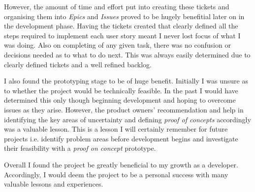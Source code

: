   However, the amount of time and effort put into creating these tickets and organising them into \textit{Epics} and \textit{Issues} proved to be hugely benefitial later on in the development phase. Having the tickets created that clearly defined all the steps required to implement each user story meant I never lost focus of what I was doing. Also on completing of any given task, there was no confusion or decisions needed as to what to do next. This was always easily determined due to clearly defined tickets and a well refined backlog.
  
  I also found the prototyping stage to be of huge benefit. Initially I was unsure as to whether the project would be technically feasible. In the past I would have determined this only though beginning development and hoping to overcome issues as they arise. However, the product owners' recommendation and help in identifying the key areas of uncertainty and defining \textit{proof of concepts} accordingly was a valuable lesson. This is a lesson I will certainly remember for future projects i.e. identify problem areas before development begins and investigate their feasibility with a \textit{proof on concept} prototype.
  
  Overall I found the project be greatly beneficial to my growth as a developer. Accordingly, I would deem the project to be a personal success with many valuable lessons and experiences.
  
  
  
